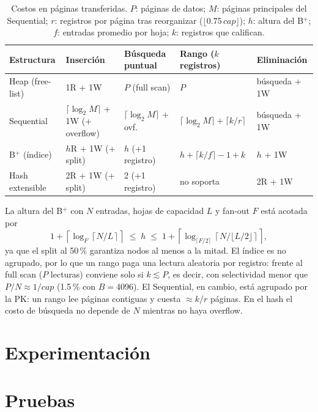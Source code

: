 \documentclass[11pt,a4paper]{article}
\begin{document}
\begin{table}[H]
\centering\small
\begin{tabular}{@{}lllll@{}}
\toprule
Estructura & Inserción & Búsqueda puntual & Rango ($k$ registros) & Eliminación \\
\midrule
Heap (free-list) & 1R + 1W & $P$ (full scan) & $P$ & búsqueda + 1W \\
Sequential & $\lceil\log_2 M\rceil$ + 1W (+ overflow) & $\lceil\log_2 M\rceil$ + ovf. & $\lceil\log_2 M\rceil + \lceil k/r\rceil$ & búsqueda + 1W \\
B$^+$ (índice) & $h$R + 1W (+ split) & $h$ (+1 registro) & $h + \lceil k/f\rceil - 1 + k$ & $h$ + 1W \\
Hash extensible & 2R + 1W (+ split) & 2 (+1 registro) & no soporta & 2R + 1W \\
\bottomrule
\end{tabular}
\caption{Costos en páginas transferidas. $P$: páginas de datos; $M$: páginas principales del
Sequential; $r$: registros por página tras reorganizar ($\lfloor 0.75\,cap\rfloor$); $h$: altura del
B$^+$; $f$: entradas promedio por hoja; $k$: registros que califican.}
\label{tab:costos}
\end{table}

La altura del B$^+$ con $N$ entradas, hojas de capacidad $L$ y fan-out $F$ está acotada por
\[
1+\left\lceil \log_{F}\left\lceil N/L\right\rceil\right\rceil \;\le\; h \;\le\; 1+\left\lceil \log_{\lceil F/2\rceil} \left\lceil N/\lfloor L/2\rfloor\right\rceil \right\rceil,
\]
ya que el split al 50\,\% garantiza nodos al menos a la mitad. El índice es no agrupado, por lo que
un rango paga una lectura aleatoria por registro: frente al full scan ($P$ lecturas) conviene solo si
$k \lesssim P$, es decir, con selectividad menor que $P/N \approx 1/cap$ (1.5\,\% con $B=4096$).
El Sequential, en cambio, está agrupado por la PK: un rango lee páginas contiguas y cuesta
$\approx k/r$ páginas. En el hash el costo de búsqueda no depende de $N$ mientras no haya overflow.

\section{Experimentación}
\label{sec:experimentos}



\section{Pruebas}
\end{document}
